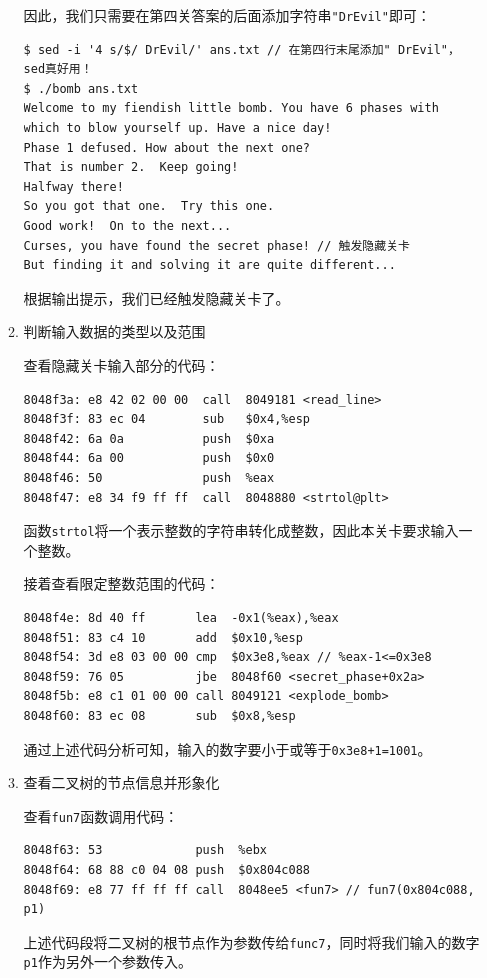 \documentclass{paper}
\begin{document}
\begin{enumerate}
\begin{enumerate}
因此，我们只需要在第四关答案的后面添加字符串\verb|"DrEvil"|即可：
\begin{lstlisting}
$ sed -i '4 s/$/ DrEvil/' ans.txt // 在第四行末尾添加" DrEvil"，sed真好用！
$ ./bomb ans.txt
Welcome to my fiendish little bomb. You have 6 phases with
which to blow yourself up. Have a nice day!
Phase 1 defused. How about the next one?
That is number 2.  Keep going!
Halfway there!
So you got that one.  Try this one.
Good work!  On to the next...
Curses, you have found the secret phase! // 触发隐藏关卡
But finding it and solving it are quite different...
\end{lstlisting}
根据输出提示，我们已经触发隐藏关卡了。

\item 判断输入数据的类型以及范围

查看隐藏关卡输入部分的代码：
\begin{lstlisting}
8048f3a: e8 42 02 00 00  call  8049181 <read_line>
8048f3f: 83 ec 04        sub   $0x4,%esp
8048f42: 6a 0a           push  $0xa
8048f44: 6a 00           push  $0x0
8048f46: 50              push  %eax
8048f47: e8 34 f9 ff ff  call  8048880 <strtol@plt>
\end{lstlisting}
函数\verb|strtol|将一个表示整数的字符串转化成整数，因此本关卡要求输入一个整数。

接着查看限定整数范围的代码：
\begin{lstlisting}
8048f4e: 8d 40 ff       lea  -0x1(%eax),%eax
8048f51: 83 c4 10       add  $0x10,%esp
8048f54: 3d e8 03 00 00 cmp  $0x3e8,%eax // %eax-1<=0x3e8
8048f59: 76 05          jbe  8048f60 <secret_phase+0x2a>
8048f5b: e8 c1 01 00 00 call 8049121 <explode_bomb>
8048f60: 83 ec 08       sub  $0x8,%esp
\end{lstlisting}
通过上述代码分析可知，输入的数字要小于或等于\verb|0x3e8+1=1001|。

\item 查看二叉树的节点信息并形象化\label{l5}

查看\verb|fun7|函数调用代码：
\begin{lstlisting}
8048f63: 53             push  %ebx
8048f64: 68 88 c0 04 08 push  $0x804c088
8048f69: e8 77 ff ff ff call  8048ee5 <fun7> // fun7(0x804c088, p1)
\end{lstlisting}
上述代码段将二叉树的根节点作为参数传给\verb|func7|，同时将我们输入的数字\verb|p1|作为另外一个参数传入。


\end{enumerate}
\end{enumerate}
\end{document}
